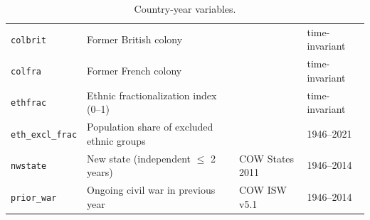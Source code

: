 \begin{table}[p]
\begin{tabular}{@{}lp{5cm}ll@{}}
    \texttt{colbrit} & Former British colony & \citet{fearon2003} & time-invariant \\
    \texttt{colfra} & Former French colony & \citet{fearon2003} & time-invariant \\
    \texttt{ethfrac} & Ethnic fractionalization index (0--1) & \citet{fearon2003} & time-invariant \\
    \texttt{eth\_excl\_frac} & Population share of excluded ethnic groups & \citet{cederman2010} & 1946--2021 \\
    \texttt{nwstate} & New state (independent $\leq$ 2 years) & COW States 2011 & 1946--2014 \\
    \texttt{prior\_war} & Ongoing civil war in previous year & COW ISW v5.1 & 1946--2014 \\
    \bottomrule
  \end{tabular}
  \caption{Country-year variables.}
  \label{tab:cy-vars}
\end{table}


